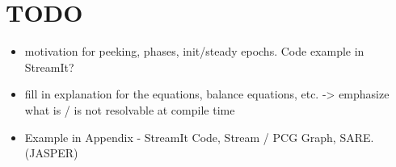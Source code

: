 \section*{TODO}

\begin{itemize}

\item motivation for peeking, phases, init/steady epochs.  Code
example in StreamIt?

\item fill in explanation for the equations, balance equations, etc.
     -> emphasize what is / is not resolvable at compile time

\item Example in Appendix - StreamIt Code, Stream / PCG Graph, SARE. (JASPER)

\end{itemize}


